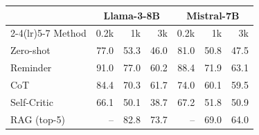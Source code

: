 \begin{tabular}{l rrr rrr}
\toprule
 & \multicolumn{3}{c}{Llama-3-8B} & \multicolumn{3}{c}{Mistral-7B} \\
\cmidrule(lr){2-4}\cmidrule(lr){5-7}
Method & 0.2k & 1k & 3k & 0.2k & 1k & 3k \\
\midrule
Zero-shot & 77.0 & 53.3 & 46.0 & 81.0 & 50.8 & 47.5 \\
Reminder & 91.0 & 77.0 & 60.2 & 88.4 & 71.9 & 63.1 \\
CoT & 84.4 & 70.3 & 61.7 & 74.0 & 60.1 & 59.5 \\
Self-Critic & 66.1 & 50.1 & 38.7 & 67.2 & 51.8 & 50.9 \\
RAG (top-5) & -- & 82.8 & 73.7 & -- & 69.0 & 64.0 \\
\bottomrule
\end{tabular}
